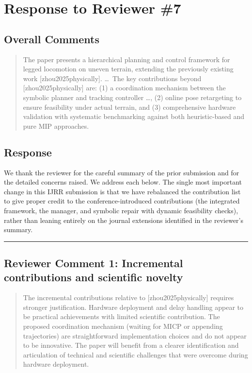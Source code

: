 \section{Response to Reviewer \#7}
\subsection*{Overall Comments}
\begin{mdframed}
\begin{quote}
The paper presents a hierarchical planning and control framework for legged locomotion on uneven terrain, extending the previously existing work [zhou2025physically]. \ldots\ The key contributions beyond [zhou2025physically] are: (1) a coordination mechanism between the symbolic planner and tracking controller \ldots, (2) online pose retargeting to ensure feasibility under actual terrain, and (3) comprehensive hardware validation with systematic benchmarking against both heuristic-based and pure MIP approaches.
\end{quote}
\end{mdframed}

\subsection{Response}
We thank the reviewer for the careful summary of the prior submission and for the detailed concerns raised. We address each below. The single most important change in this IJRR submission is that we have rebalanced the contribution list to give proper credit to the conference-introduced contributions (the integrated framework, the manager, and symbolic repair with dynamic feasibility checks), rather than leaning entirely on the journal extensions identified in the reviewer's summary.

\noindent\rule{17cm}{2.0pt}

\subsection{Reviewer Comment 1: Incremental contributions and scientific novelty}
\begin{mdframed}
\begin{quote}
The incremental contributions relative to [zhou2025physically] requires stronger justification. Hardware deployment and delay handling appear to be practical achievements with limited scientific contribution. The proposed coordination mechanism (waiting for MICP or appending trajectories) are straightforward implementation choices and do not appear to be innovative. The paper will benefit from a clearer identification and articulation of technical and scientific challenges that were overcome during hardware deployment.
\end{quote}
\end{mdframed}

